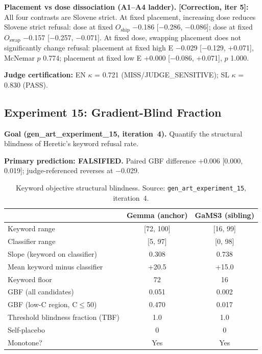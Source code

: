 \documentclass[11pt,letterpaper]{article}
\newcommand{\corr}[1]{\noindent\textbf{[Correction, iter #1]:}~}
\begin{document}
\textbf{Placement vs dose dissociation (A1--A4 ladder).} \corr{5} All four contrasts are Slovene strict. At fixed placement, increasing dose reduces Slovene strict refusal: dose at fixed $O_\mathrm{ship}$ $-$0.186 [$-$0.286, $-$0.086]; dose at fixed $O_\mathrm{swap}$ $-$0.157 [$-$0.257, $-$0.071]. At fixed dose, swapping placement does not significantly change refusal: placement at fixed high E $-$0.029 [$-$0.129, +0.071], McNemar $p$ 0.774; placement at fixed low E +0.000 [$-$0.086, +0.071], $p$ 1.000.

\textbf{Judge certification:} EN $\kappa$ = 0.721 (MISS/JUDGE\_SENSITIVE); SL $\kappa$ = 0.830 (PASS).


\subsection{Experiment 15: Gradient-Blind Fraction}\label{sec:exp15}

\textbf{Goal (gen\_art\_experiment\_15, iteration~4).} Quantify the structural blindness of Heretic's keyword refusal rate.

\textbf{Primary prediction: FALSIFIED.} Paired GBF difference +0.006 [0.000, 0.019]; judge-referenced reverses at $-$0.029.

\begin{table}[!htbp]
\centering
\caption{Keyword objective structural blindness. Source: \texttt{gen\_art\_experiment\_15}, iteration~4.}
\label{tab:exp15_structural}
\small
\begin{tabular}{lcc}
\toprule
& Gemma (anchor) & GaMS3 (sibling) \\
\midrule
Keyword range & [72, 100] & [16, 99] \\
Classifier range & [5, 97] & [0, 98] \\
Slope (keyword on classifier) & 0.308 & 0.738 \\
Mean keyword minus classifier & +20.5 & +15.0 \\
Keyword floor & 72 & 16 \\
GBF (all candidates) & 0.051 & 0.002 \\
GBF (low-C region, C$\leq$50) & 0.470 & 0.017 \\
Threshold blindness fraction (TBF) & 1.0 & 1.0 \\
Self-placebo & 0 & 0 \\
Monotone? & Yes & Yes \\
\bottomrule
\end{tabular}
\end{table}
\end{document}
